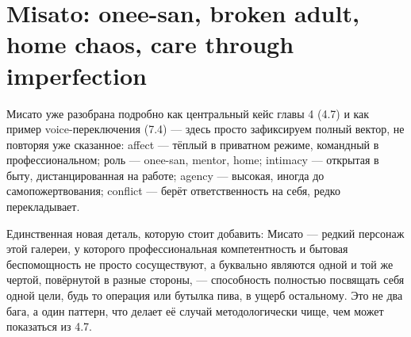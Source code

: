 \section{Misato: onee-san, broken adult, home chaos, care through imperfection}

Мисато уже разобрана подробно как центральный кейс главы 4 (4.7) и как пример voice-переключения (7.4) — здесь просто зафиксируем полный вектор, не повторяя уже сказанное: affect — тёплый в приватном режиме, командный в профессиональном; роль — onee-san, mentor, home; intimacy — открытая в быту, дистанцированная на работе; agency — высокая, иногда до самопожертвования; conflict — берёт ответственность на себя, редко перекладывает.

Единственная новая деталь, которую стоит добавить: Мисато — редкий персонаж этой галереи, у которого профессиональная компетентность и бытовая беспомощность не просто сосуществуют, а буквально являются одной и той же чертой, повёрнутой в разные стороны, — способность полностью посвящать себя одной цели, будь то операция или бутылка пива, в ущерб остальному. Это не два бага, а один паттерн, что делает её случай методологически чище, чем может показаться из 4.7.
